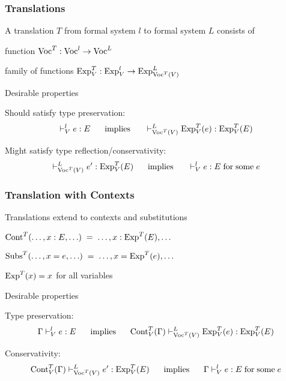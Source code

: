 \begin{frame}\frametitle{Translations}
\begin{blockitems}{A translation $T$ from formal system $l$ to formal system $L$ consists of}
\item function $\mathrm{Voc}^T:\mathrm{Voc}^l\to\mathrm{Voc}^L$
\item family of functions $\mathrm{Exp}^T_V:\mathrm{Exp}^l_V\to\mathrm{Exp}^L_{\mathrm{Voc}^T(V)}$
\end{blockitems}

\begin{blockitems}{Desirable properties}
\item Should satisfy type preservation:
\[\vdash^l_V e:E \hspace*{.5cm}\;\mathrm{implies}\;\hspace*{.5cm} \vdash^L_{\mathrm{Voc}^T(V)} \mathrm{Exp}^T_V(e):\mathrm{Exp}^T_V(E)\]
\item Might satisfy type reflection/conservativity: 
\[\vdash^L_{\mathrm{Voc}^T(V)} e':\mathrm{Exp}^T_V(E) \hspace*{.5cm}\;\mathrm{implies}\;\hspace*{.5cm} \vdash^l_V e:E \;\mathrm{for}\;\mathrm{some}\; e\]
\end{blockitems}
\end{frame}

\begin{frame}\frametitle{Translation with Contexts}
\begin{blockitems}{Translations extend to contexts and substitutions}
 \item $\mathrm{Cont}^T(\ldots,x:E,\ldots) \;=\;\ldots, x:\mathrm{Exp}^T(E), \ldots$
 \item $\mathrm{Subs}^T(\ldots,x=e,\ldots) \;=\;\ldots, x=\mathrm{Exp}^T(e), \ldots$
 \item $\mathrm{Exp}^T(x)=x$ for all variables
\end{blockitems}

\begin{blockitems}{Desirable properties}
\item Type preservation:
\[\Gamma\vdash^l_V e:E \hspace*{.5cm}\;\mathrm{implies}\;\hspace*{.5cm} \mathrm{Cont}^T_V(\Gamma)\vdash^L_{\mathrm{Voc}^T(V)} \mathrm{Exp}^T_V(e):\mathrm{Exp}^T_V(E)\]
\item Conservativity:
\[\mathrm{Cont}^T_V(\Gamma)\vdash^L_{\mathrm{Voc}^T(V)} e':\mathrm{Exp}^T_V(E) \hspace*{.5cm}\;\mathrm{implies}\;\hspace*{.5cm} \Gamma\vdash^l_V e:E \;\mathrm{for}\;\mathrm{some}\; e\]
\end{blockitems}
\end{frame}

